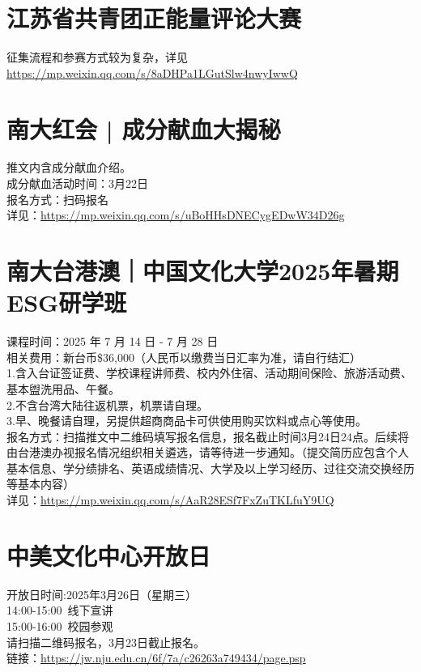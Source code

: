 \documentclass[letterpaper, 12pt]{article}
\begin{document}
\begin{multicols}{2}
\section{江苏省共青团正能量评论大赛}
征集流程和参赛方式较为复杂，详见\url{https://mp.weixin.qq.com/s/8aDHPa1LGutSlw4nwyIwwQ}
\section{南大红会 | 成分献血大揭秘}
推文内含成分献血介绍。
\\成分献血活动时间：3月22日
\\报名方式：扫码报名
\\详见：\url{https://mp.weixin.qq.com/s/uBoHHsDNECygEDwW34D26g}


\section{南大台港澳｜中国文化大学2025年暑期ESG研学班}
课程时间：2025 年 7 月 14 日 -  7 月 28 日
\\相关费用：新台币\$36,000（人民币以缴费当日汇率为准，请自行结汇）
\\1.含入台证签证费、学校课程讲师费、校内外住宿、活动期间保险、旅游活动费、基本盥洗用品、午餐。
\\2.不含台湾大陆往返机票，机票请自理。
\\3.早、晚餐请自理，另提供超商商品卡可供使用购买饮料或点心等使用。
\\报名方式：扫描推文中二维码填写报名信息，报名截止时间3月24日24点。后续将由台港澳办视报名情况组织相关遴选，请等待进一步通知。（提交简历应包含个人基本信息、学分绩排名、英语成绩情况、大学及以上学习经历、过往交流交换经历等基本内容）
\\详见：\url{https://mp.weixin.qq.com/s/AaR28ESf7FxZuTKLfuY9UQ}


\section{中美文化中心开放日}
开放日时间:2025年3月26日（星期三）\\
14:00-15:00 线下宣讲\\
15:00-16:00 校园参观\\
请扫描二维码报名，3月23日截止报名。\\
链接：\url{https://jw.nju.edu.cn/6f/7a/c26263a749434/page.psp}

\end{multicols}
\end{document}
